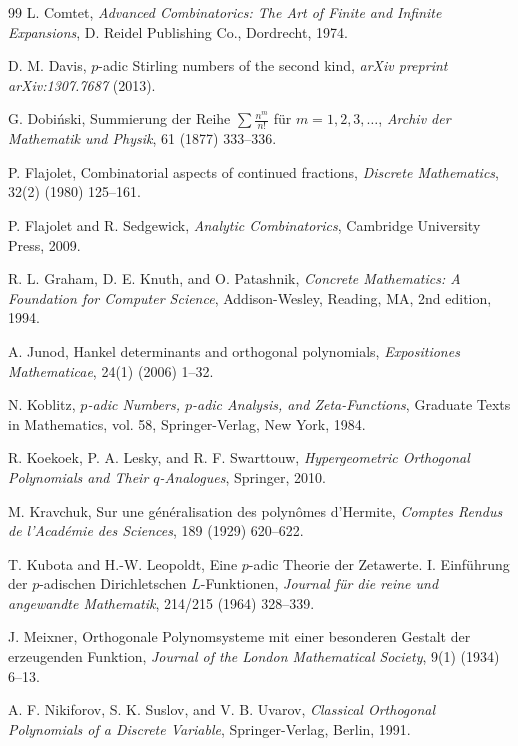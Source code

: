 \documentclass[12pt]{amsart}
\theoremstyle{definition}
\begin{document}
\begin{thebibliography}{99}
L. Comtet,
\textit{Advanced Combinatorics: The Art of Finite and Infinite Expansions},
D. Reidel Publishing Co., Dordrecht, 1974.

D. M. Davis,
$p$-adic Stirling numbers of the second kind,
\textit{arXiv preprint arXiv:1307.7687} (2013).

G. Dobiński,
Summierung der Reihe $\sum \frac{n^m}{n!}$ für $m = 1, 2, 3, \dots$,
\textit{Archiv der Mathematik und Physik}, 61 (1877) 333--336.

P. Flajolet, 
Combinatorial aspects of continued fractions, 
\textit{Discrete Mathematics}, 32(2) (1980) 125--161.

P. Flajolet and R. Sedgewick,
\textit{Analytic Combinatorics},
Cambridge University Press, 2009.

R. L. Graham, D. E. Knuth, and O. Patashnik,
\textit{Concrete Mathematics: A Foundation for Computer Science},
Addison-Wesley, Reading, MA, 2nd edition, 1994.

A. Junod, 
Hankel determinants and orthogonal polynomials, 
\textit{Expositiones Mathematicae}, 24(1) (2006) 1--32.

N. Koblitz,
\textit{$p$-adic Numbers, $p$-adic Analysis, and Zeta-Functions},
Graduate Texts in Mathematics, vol. 58, Springer-Verlag, New York, 1984.

R. Koekoek, P. A. Lesky, and R. F. Swarttouw,
\textit{Hypergeometric Orthogonal Polynomials and Their $q$-Analogues},
Springer, 2010.

M. Kravchuk, 
Sur une généralisation des polynômes d'Hermite, 
\textit{Comptes Rendus de l'Académie des Sciences}, 189 (1929) 620--622.

T. Kubota and H.-W. Leopoldt,
Eine $p$-adic Theorie der Zetawerte. I. Einführung der $p$-adischen Dirichletschen $L$-Funktionen,
\textit{Journal für die reine und angewandte Mathematik}, 214/215 (1964) 328--339.

J. Meixner,
Orthogonale Polynomsysteme mit einer besonderen Gestalt der erzeugenden Funktion,
\textit{Journal of the London Mathematical Society}, 9(1) (1934) 6--13.

A. F. Nikiforov, S. K. Suslov, and V. B. Uvarov, 
\textit{Classical Orthogonal Polynomials of a Discrete Variable}, 
Springer-Verlag, Berlin, 1991.


\end{thebibliography}
\end{document}
